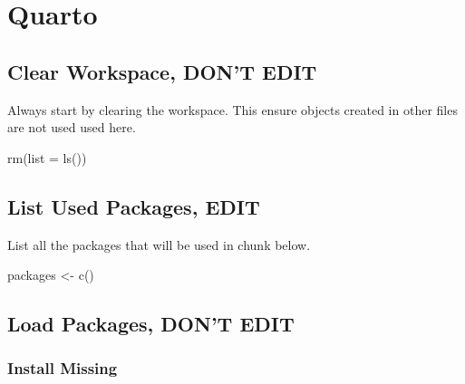 \documentclass[
  letterpaper,
  DIV=11,
  numbers=noendperiod]{scrreprt}
\newenvironment{Shaded}{\begin{snugshade}}{\end{snugshade}}
\newcommand{\AttributeTok}[1]{\textcolor[rgb]{0.40,0.45,0.13}{#1}}
\newcommand{\FunctionTok}[1]{\textcolor[rgb]{0.28,0.35,0.67}{#1}}
\newcommand{\NormalTok}[1]{\textcolor[rgb]{0.00,0.23,0.31}{#1}}
\newcommand{\OtherTok}[1]{\textcolor[rgb]{0.00,0.23,0.31}{#1}}
\begin{document}
\chapter{Quarto}\label{quarto}

\section*{Clear Workspace, DON'T
EDIT}\label{clear-workspace-dont-edit-1}


Always start by clearing the workspace. This ensure objects created in
other files are not used used here.

\begin{Shaded}
\begin{Highlighting}[]
\FunctionTok{rm}\NormalTok{(}\AttributeTok{list =} \FunctionTok{ls}\NormalTok{())}
\end{Highlighting}
\end{Shaded}

\section*{List Used Packages, EDIT}\label{list-used-packages-edit-1}


List all the packages that will be used in chunk below.

\begin{Shaded}
\begin{Highlighting}[]
\NormalTok{packages }\OtherTok{\textless{}{-}} \FunctionTok{c}\NormalTok{()}
\end{Highlighting}
\end{Shaded}

\section*{Load Packages, DON'T EDIT}\label{sec-packages}


\subsection*{Install Missing}\label{install-missing-1}
\end{document}
